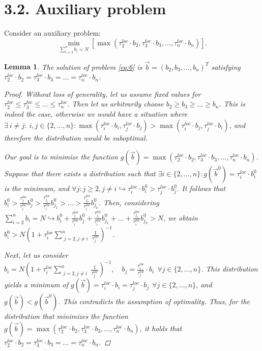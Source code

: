 \documentclass{article}
\theoremstyle{definition}
\theoremstyle{plain}
\newtheorem{lemma}[theorem]{Lemma}
\begin{document}
\section*{3.2. Auxiliary problem}
Consider an auxiliary problem:
\begin{equation}
    \label{eq:6}
    \underset{\sum\limits_{i = 2}^{n} b_i = N}{\min} [\max(\tau_2^{loc}\cdot b_2, \tau_3^{loc}\cdot b_3, \ldots, \tau_n^{loc}\cdot b_n)].
\end{equation}


\begin{lemma}
    \label{l1}
    The solution of problem \eqref{eq:6} is $\overrightarrow{b} = (b_2, b_3, \ldots, b_n)^{T}$ satisfying $\tau_2^{loc}\cdot b_2 = \tau_3^{loc}\cdot b_3 = \ldots = \tau_n^{loc}\cdot b_n$.
    \begin{proof}
        
        Without loss of generality, let us assume fixed values for $\tau_2^{loc}\leq \tau_3^{loc}\leq \ldots \leq \tau_n^{loc}$. 
        Then let us arbitrarily choose $b_2\geq b_3\geq \ldots \geq b_n$. 
        This is indeed the case, otherwise we would have a situation where $\exists ~ i \neq j: ~ i, j\in \{2, \ldots, n\} : \max(\tau_i^{loc}\cdot b_i, \tau_j^{loc}\cdot b_j) > \max(\tau_i^{loc}\cdot b_j, \tau_j^{loc}\cdot b_i)$, and therefore the distribution would be suboptimal. 
        
        Our goal is to minimize the function $g(\overrightarrow{b}) = \max(\tau_2^{loc}\cdot b_2, \tau_3^{loc}\cdot b_3, \ldots, \tau_n^{loc}\cdot b_n)$. 
        Suppose that there exists a distribution such that $\exists i \in \{2, \ldots, n\}: g(\overrightarrow{b}^0) = \tau_i^{loc}\cdot b_i^0$ is the minimum, and $\forall j: j \geq 2, j \neq i \hookrightarrow \tau_i^{loc}\cdot b_i^0 > \tau_j^{loc}\cdot b_j^0$. 
        It follows that $b_i^0 > \frac{\tau_j^{loc}}{\tau_i^{loc}}b_j^0 > \frac{\tau_{j_1}^{loc}}{\tau_i^{loc}}b_{j_1}^0 > \ldots > \frac{\tau_{j_k}^{loc}}{\tau_i^{loc}}b_{j_k}^0$. 
        Then, considering $\sum\limits_{i = 2}^n b_i = N \hookrightarrow b_i^0 + \frac{\tau_j^{loc}}{\tau_i^{loc}}b_j^0 + \frac{\tau_{j_1}^{loc}}{\tau_i^{loc}}b_{j_1}^0 + \ldots + \frac{\tau_{j_k}^{loc}}{\tau_i^{loc}}b_{j_k}^0 > N$,
        we obtain 
        $b_i^0 > N(1 + \tau_i^{loc}\sum\limits_{\substack{j = 2, j \neq i}}^n \frac{1}{\tau_j^{loc}})^{-1}$.
        
        Next, let us consider $b_i = N(1 + \tau_i^{loc}\sum\limits_{\substack{j = 2, j \neq i}}^n \frac{1}{\tau_j^{loc}})^{-1}, \quad b_j = \frac {\tau_i^{loc}}{\tau_j^{loc}}\cdot b_i  ~~ \forall j \in \{2,\ldots,n\}$. 
        This distribution yields a minimum of $g(\overrightarrow{b}) = \tau_i^{loc}\cdot b_i = \tau_j^{loc}\cdot b_j ~~ \forall j \in \{2,\ldots,n\}$, and $g(\overrightarrow{b}) < g(\overrightarrow{b}^0)$. 
        This contradicts the assumption of optimality. 
        Thus, for the distribution that minimizes the function $g(\overrightarrow{b}) = \max(\tau_2^{loc}\cdot b_2, \tau_3^{loc}\cdot b_3, \ldots, \tau_n^{loc}\cdot b_n)$, it holds that $\tau_2^{loc}\cdot b_2 = \tau_3^{loc}\cdot b_3 = \ldots = \tau_n^{loc}\cdot b_n$.
    \end{proof}
\end{lemma}
\end{document}
